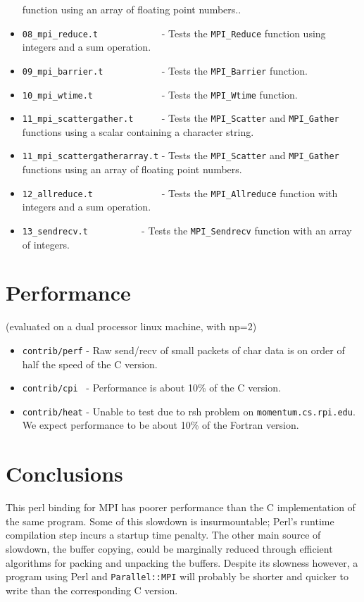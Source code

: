 \documentclass{report}
\begin{document}
\begin{itemize}
function using an array of floating point numbers..
	\item \verb|08_mpi_reduce.t            | - Tests the \verb|MPI_Reduce|
function using integers and a sum operation.
	\item \verb|09_mpi_barrier.t           | - Tests the
\verb|MPI_Barrier| function.
	\item \verb|10_mpi_wtime.t             | - Tests the
\verb|MPI_Wtime| function.
	\item \verb|11_mpi_scattergather.t     | - Tests the
\verb|MPI_Scatter| and \verb|MPI_Gather| functions using a scalar
containing a character string.
	\item \verb|11_mpi_scattergatherarray.t| - Tests the
\verb|MPI_Scatter| and \verb|MPI_Gather| functions using an array of
floating point numbers.
	\item \verb|12_allreduce.t             | - Tests the
\verb|MPI_Allreduce| function with integers and a sum operation.
	\item \verb|13_sendrecv.t	       | - Tests the
\verb|MPI_Sendrecv| function with an array of integers.
\end{itemize}	

\section*{Performance}

   (evaluated on a dual processor linux machine, with np=2)

\begin{itemize}
   \item \verb|contrib/perf| - Raw send/recv of small packets of char
data is on order of half the speed of the C version. 
   \item \verb|contrib/cpi | - Performance is about 10\% of the C version.
   \item \verb|contrib/heat| - Unable to test due to rsh problem on
\verb|momentum.cs.rpi.edu|.  We expect performance to be about 10\% of
the Fortran version.
   
\end{itemize}


\section*{Conclusions}
	This perl binding for MPI has poorer performance than the C
implementation of the same program.  Some of this slowdown
is insurmountable; Perl's runtime compilation step incurs a startup time
penalty.  The other main source of slowdown, the buffer copying, could 
be marginally reduced through efficient algorithms for packing and
unpacking the buffers.  Despite its slowness however, a program using
Perl and \verb|Parallel::MPI| will probably be shorter and quicker to write
than the corresponding C version.
  
\end{document}
